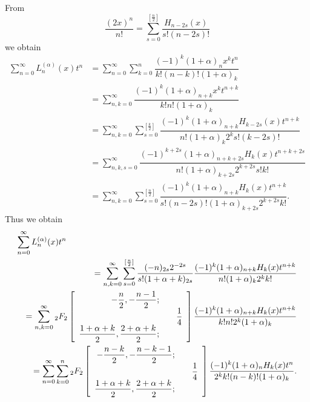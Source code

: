 \begin{solution}
From 
$$\dfrac{(2x)^n}{n!} = \displaystyle\sum_{s=0}^{[\frac{n}{2}]} \dfrac{H_{n-2s}(x)}{s! (n-2s)!}$$
we obtain
$$\begin{array}{ll}
\displaystyle\sum_{n=0}^{\infty} L_n^{(\alpha)}(x) t^n &= \displaystyle\sum_{n=0}^{\infty} \displaystyle\sum_{k=0}^n \dfrac{(-1)^k (1+\alpha)_n x^k t^n}{k! (n-k)! (1+\alpha)_k} \\
&= \displaystyle\sum_{n,k=0}^{\infty} \dfrac{(-1)^k (1+\alpha)_{n+k} x^k t^{n+k}}{k! n! (1+\alpha)_k} \\
&= \displaystyle\sum_{n,k=0}^{\infty} \displaystyle\sum_{s=0}^{[\frac{k}{2}]} \dfrac{(-1)^k (1+\alpha)_{n+k} H_{k-2s}(x) t^{n+k}}{n! (1+\alpha)_k 2^k s! (k-2s)!} \\
&= \displaystyle\sum_{n,k,s=0}^{\infty} \dfrac{(-1)^{k+2s} (1+\alpha)_{n+k+2s} H_k(x) t^{n+k+2s}}{n! (1+\alpha)_{k+2s} 2^{k+2s} s! k!} \\
&= \displaystyle\sum_{n,k=0}^{\infty} \displaystyle\sum_{s=0}^{[\frac{n}{2}]} \dfrac{(-1)^k (1+\alpha)_{n+k} H_k(x) t^{n+k}}{s! (n-2s)! (1+\alpha)_{k+2s} 2^{k+2s}k!}.
\end{array}$$
Thus we obtain
\begin{eqnarray*}
\lefteqn{\displaystyle\sum_{n=0}^{\infty} L_n^{(\alpha)}(x)t^n} \\
& &= \displaystyle\sum_{n,k=0}^{\infty} \displaystyle\sum_{s=0}^{[\frac{n}{2}]} \dfrac{(-n)_{2s} 2^{-2s}}{s! (1+\alpha+k)_{2s}} \dfrac{(-1)^k (1+\alpha)_{n+k} H_k(x) t^{n+k}}{n! (1+\alpha)_k 2^k k!} \\
&&= \displaystyle\sum_{n,k=0}^{\infty} {}_2F_2 \left[ \begin{array}{rlr}
-\dfrac{n}{2}, - \dfrac{n-1}{2}; & & \\
& & \dfrac{1}{4} \\
\dfrac{1+\alpha+k}{2}, \dfrac{2+\alpha+k}{2}; & &
\end{array} \right] \dfrac{(-1)^k (1+\alpha)_{n+k} H_k(x) t^{n+k}}{k! n! 2^k (1+\alpha)_k} \\
&&= \displaystyle\sum_{n=0}^{\infty} \displaystyle\sum_{k=0}^n {}_2F_2 \left[ \begin{array}{rlr}
-\dfrac{n-k}{2}, -\dfrac{n-k-1}{2}; & & \\
& & \dfrac{1}{4} \\
\dfrac{1+\alpha+k}{2}, \dfrac{2+\alpha+k}{2}; & & 
\end{array} \right] \dfrac{(-1)^k (1+\alpha)_n H_k(x) t^n}{2^k k! (n-k)! (1+\alpha)_k}.
\end{eqnarray*}
\end{solution}
